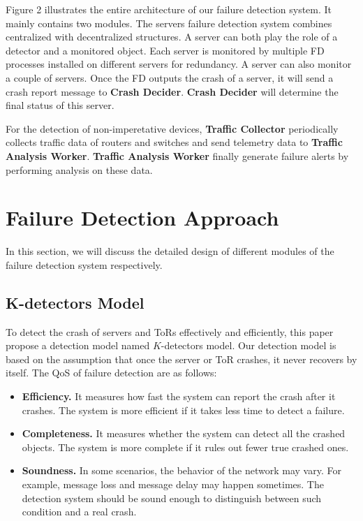 \documentclass{sig-alternate-05-2015}
\begin{document}
Figure 2 illustrates the entire architecture of our failure detection system. It mainly contains two modules. The servers failure detection system combines centralized with decentralized structures. A server can both play the role of a detector and a monitored object. Each server is monitored by multiple FD processes installed on different servers for redundancy. A server can also monitor a couple of servers. Once the FD outputs the crash of a server, it will send a crash report message to \textbf{Crash Decider}. \textbf{Crash Decider} will determine the final status of this server.

For the detection of non-imperetative devices, \textbf{Traffic Collector} periodically collects traffic data of routers and switches and send telemetry data to \textbf{Traffic Analysis Worker}. \textbf{Traffic Analysis Worker} finally generate failure alerts by performing analysis on these data.



\section{Failure Detection Approach}
In this section, we will discuss the detailed design of different modules of the failure detection system respectively.

\subsection{K-detectors Model}
To detect the crash of servers and ToRs effectively and efficiently, this paper propose a detection model named $K$-detectors model. Our detection model is based on the assumption that once the server or ToR crashes, it never recovers by itself. The QoS of failure detection are as follows:

\begin{itemize}
\item \textbf{Efficiency.} It measures how fast the system can report the crash after it crashes. The system is more efficient if it takes less time to detect a failure.
\item \textbf{Completeness.} It measures whether the system can detect all the crashed objects. The system is more complete if it rules out fewer true crashed ones.
\item \textbf{Soundness.} In some scenarios, the behavior of the network may vary. For example, message loss and message delay may happen sometimes. The detection system should be sound enough to distinguish between such condition and a real crash.

\end{itemize}
\end{document}
